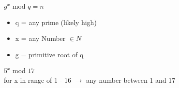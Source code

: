 \documentclass[15pt]{article}
\begin{document}
$g^x$ mod $q = n$\\


\begin{itemize}
    \item q = any prime (likely high)
    \item x = any Number $\in N$
    \item g = primitive root of q
\end{itemize}

\hfill \break

$5^x$ mod $17$\\

for x in range of 1 - 16 $\rightarrow$ any number between 1 and 17
\end{document}
